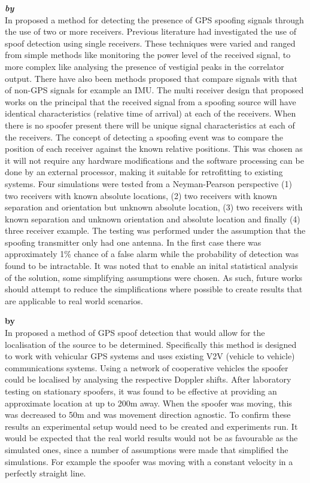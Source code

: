 \medskip

\textbf{\emph{ by \citeauthor{RN10}}} \\
In \citeyear{RN10} \citeauthor{RN10} \cite{RN10} proposed a method for detecting the presence of GPS spoofing signals through the use of two or more receivers. Previous
literature had investigated the use of spoof detection using single receivers. These techniques were varied and ranged from simple methods like monitoring the power level
of the received signal, to more complex like analysing the presence of vestigial peaks in the correlator output. There have also been methods proposed that compare
signals with that of non-GPS signals for example an IMU. The multi receiver design that \citeauthor{RN10} proposed works on the principal that the received signal from a
spoofing source will have identical characteristics (relative time of arrival) at each of the receivers. When there is no spoofer present there will be unique signal
characteristics at each of the receivers. The concept of detecting a spoofing event was to compare the position of each receiver against the known relative positions. This
was chosen as it will not require any hardware modifications and the software processing can be done by an external processor, making it suitable for retrofitting to
existing systems. Four simulations were tested from a Neyman-Pearson perspective (1) two receivers with known
absolute locations, (2) two receivers with known separation and orientation but unknown absolute location, (3) two receivers with known separation and unknown orientation
and absolute location and finally (4) three receiver example. The testing was performed under the assumption that the spoofing transmitter only had one antenna. In the
first case there was approximately 1\% chance of a false alarm while the probability of detection was found to be intractable.
It was noted that to enable an inital statistical analysis of the solution, some simplifying assumptions were chosen. As such, future works should attempt to reduce the
simplifications where possible to create results that are applicable to real world scenarios.

\medskip

\textbf{\emph{} by \citeauthor{RN1}} \\
In \citeyear{RN1} \citeauthor{RN1} \cite{RN1} proposed a method of GPS spoof detection that would allow for the localisation
of the source to be determined. Specifically this method is designed to work with vehicular GPS systems and uses existing 
V2V (vehicle to vehicle) communications systems. Using a network of cooperative vehicles the spoofer could be localised by analysing the respective
Doppler shifts. After laboratory testing on stationary spoofers, it was found to be effective at providing an approximate location at up to 200m away.
When the spoofer was moving, this was decreased to 50m and was movement direction agnostic. To confirm these results an experimental setup would need
to be created and experiments run. It would be expected that the real world results would not be as favourable as the simulated ones, since a number of
assumptions were made that simplified the simulations. For example the spoofer was moving with a constant velocity in a perfectly straight line.

